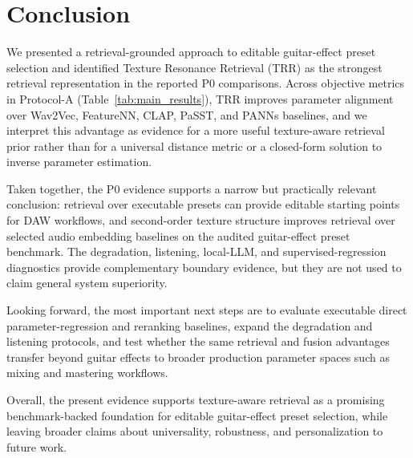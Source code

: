 \section{Conclusion}
\label{sec:conclusion}

We presented a retrieval-grounded approach to editable guitar-effect preset selection and identified Texture Resonance Retrieval (TRR) as the strongest retrieval representation in the reported P0 comparisons. Across objective metrics in Protocol-A (Table~\ref{tab:main_results}), TRR improves parameter alignment over Wav2Vec, FeatureNN, CLAP, PaSST, and PANNs baselines, and we interpret this advantage as evidence for a more useful texture-aware retrieval prior rather than for a universal distance metric or a closed-form solution to inverse parameter estimation.

Taken together, the P0 evidence supports a narrow but practically relevant conclusion: retrieval over executable presets can provide editable starting points for DAW workflows, and second-order texture structure improves retrieval over selected audio embedding baselines on the audited guitar-effect preset benchmark. The degradation, listening, local-LLM, and supervised-regression diagnostics provide complementary boundary evidence, but they are not used to claim general system superiority.

Looking forward, the most important next steps are to evaluate executable direct parameter-regression and reranking baselines, expand the degradation and listening protocols, and test whether the same retrieval and fusion advantages transfer beyond guitar effects to broader production parameter spaces such as mixing and mastering workflows.

Overall, the present evidence supports texture-aware retrieval as a promising benchmark-backed foundation for editable guitar-effect preset selection, while leaving broader claims about universality, robustness, and personalization to future work.


\begingroup
\sloppy
\raggedright
{}

\endgroup
